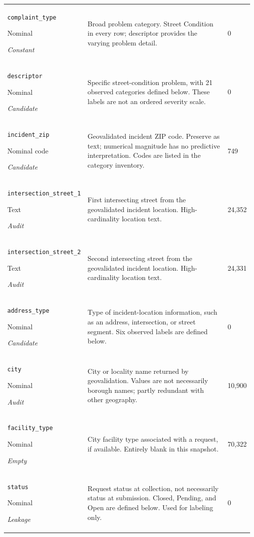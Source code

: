 \begin{longtable}{@{}p{.27\linewidth}p{.60\linewidth}p{.07\linewidth}@{}}
\texttt{complaint\_\allowbreak{}type}\par Nominal\par\emph{Constant} & Broad problem category. Street Condition in every row; descriptor provides the varying problem detail. & 0\\
\texttt{descriptor}\par Nominal\par\emph{Candidate} & Specific street-condition problem, with 21 observed categories defined below. These labels are not an ordered severity scale. & 0\\
\texttt{incident\_\allowbreak{}zip}\par Nominal code\par\emph{Candidate} & Geovalidated incident ZIP code. Preserve as text; numerical magnitude has no predictive interpretation. Codes are listed in the category inventory. & 749\\
\texttt{intersection\_\allowbreak{}street\_\allowbreak{}1}\par Text\par\emph{Audit} & First intersecting street from the geovalidated incident location. High-cardinality location text. & 24,352\\
\texttt{intersection\_\allowbreak{}street\_\allowbreak{}2}\par Text\par\emph{Audit} & Second intersecting street from the geovalidated incident location. High-cardinality location text. & 24,331\\
\texttt{address\_\allowbreak{}type}\par Nominal\par\emph{Candidate} & Type of incident-location information, such as an address, intersection, or street segment. Six observed labels are defined below. & 0\\
\texttt{city}\par Nominal\par\emph{Audit} & City or locality name returned by geovalidation. Values are not necessarily borough names; partly redundant with other geography. & 10,900\\
\texttt{facility\_\allowbreak{}type}\par Nominal\par\emph{Empty} & City facility type associated with a request, if available. Entirely blank in this snapshot. & 70,322\\
\texttt{status}\par Nominal\par\emph{Leakage} & Request status at collection, not necessarily status at submission. Closed, Pending, and Open are defined below. Used for labeling only. & 0\\

\end{longtable}
